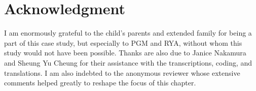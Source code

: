 \documentclass[output=paper,colorlinks,citecolor=brown]{langscibook}
\begin{document}
\section*{Acknowledgment}

I am enormously grateful to the child’s parents and extended family for being a part of this case study, but especially to PGM and RYA, without whom this study would not have been possible. Thanks are also due to Janice Nakamura and Sheung Yu Cheung for their assistance with the transcriptions, coding, and translations. I am also indebted to the anonymous reviewer whose extensive comments helped greatly to reshape the focus of this chapter.
\sloppy\printbibliography[heading=subbibliography,notkeyword=this]
\end{document}
